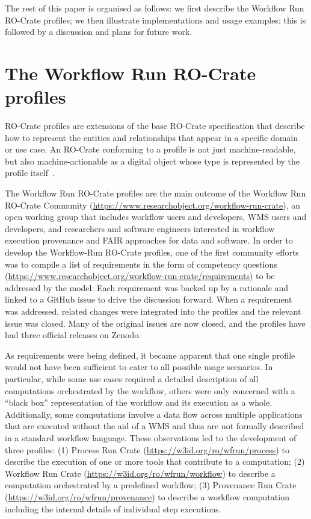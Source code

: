 \documentclass[10pt,letterpaper]{article}
\begin{document}
The rest of this paper is organised as follows: we first describe the Workflow Run RO-Crate profiles; we then illustrate implementations and usage examples; this is followed by a discussion and plans for future work.


\section{The Workflow Run RO-Crate profiles}\label{the-workflow-run-ro-crate-profiles}

RO-Crate profiles are extensions of the base RO-Crate specification that describe how to represent the entities and relationships that appear in a specific domain or use case.
An RO-Crate conforming to a profile is not just machine-readable, but also machine-actionable as a digital object whose type is represented by the profile itself~\cite{Soiland-Reyes 2022b}.

The Workflow Run RO-Crate profiles are the main outcome of the Workflow Run RO-Crate Community (\url{https://www.researchobject.org/workflow-run-crate}), an open working group that includes workflow users and developers, WMS users and developers, and researchers and software engineers interested in workflow execution provenance and FAIR approaches for data and software.
In order to develop the Workflow-Run RO-Crate profiles, one of the first community efforts was to compile a list of requirements in the form of competency questions (\url{https://www.researchobject.org/workflow-run-crate/requirements}) to be addressed by the model.
Each requirement was backed up by a rationale and linked to a GitHub issue to drive the discussion forward. When a requirement was addressed, related changes were integrated into the profiles and the relevant issue was closed. Many of the original issues are now closed, and the profiles have had three official releases on Zenodo.


As requirements were being defined, it became apparent that one single profile would not have been sufficient to cater to all possible usage scenarios.
In particular, while some use cases required a detailed description of all computations orchestrated by the workflow, others were only concerned with a ``black box'' representation of the workflow and its execution as a whole.
Additionally, some computations involve a data flow across multiple applications that are executed without the aid of a WMS and thus are not formally described in a standard workflow language.
These observations led to the development of three profiles: 
(1) Process Run Crate (\url{https://w3id.org/ro/wfrun/process})
\cite{WRROC 2023a} to describe the execution of one or more tools that contribute to a computation;
(2) Workflow Run Crate (\url{https://w3id.org/ro/wfrun/workflow})
\cite{WRROC 2023b} to describe a computation orchestrated by a predefined workflow; 
(3) Provenance Run Crate (\url{https://w3id.org/ro/wfrun/provenance})
\cite{WRROC 2023c} to describe a workflow computation including the internal details of individual step executions.
\end{document}
